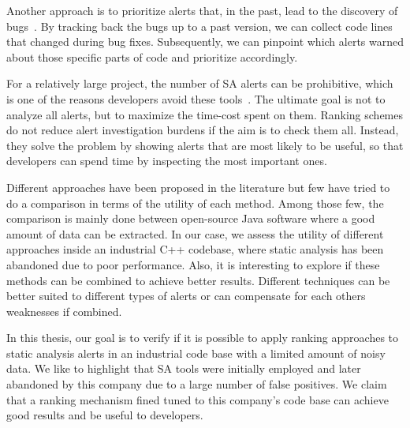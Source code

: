 Another approach is to prioritize alerts that, in the past, lead to the discovery of bugs~\cite{which_warnings,automatic_training_set}. By tracking back the bugs up to a past version, we can collect code lines that changed during bug fixes. Subsequently, we can pinpoint which alerts warned about those specific parts of code and prioritize accordingly.

For a relatively large project, the number of SA alerts can be prohibitive, which is one of the reasons developers avoid these tools~\cite{why_dont_use}. The ultimate goal is not to analyze all alerts, but to maximize the time-cost spent on them. Ranking schemes do not reduce alert investigation burdens if the aim is to check them all. Instead, they solve the problem by showing alerts that are most likely to be useful, so that developers can spend time by inspecting the most important ones.

Different approaches have been proposed in the literature but few have tried to do a comparison in terms of the utility of each method. Among those few, the comparison is mainly done between open-source Java software where a good amount of data can be extracted. In our case, we assess the utility of different approaches inside an industrial C++ codebase, where static analysis has been abandoned due to poor performance. Also, it is interesting to explore if these methods can be combined to achieve better results. Different techniques can be better suited to different types of alerts or can compensate for each others weaknesses if combined.




In this thesis, our goal is to verify if it is possible to apply ranking approaches to static analysis alerts in an industrial code base with a limited amount of noisy data. We like to highlight that SA tools were initially employed and later abandoned by this company due to a large number of false positives. We claim that a ranking mechanism fined tuned to this company's code base can achieve good results and be useful to developers.

